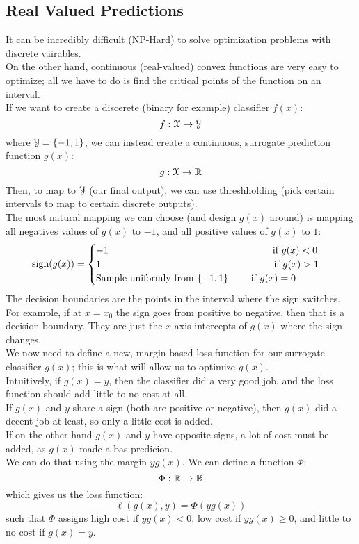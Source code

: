 \documentclass[12pt]{article}
\begin{document}
\newpage

\subsection*{Real Valued Predictions}

It can be incredibly difficult (NP-Hard)
to solve optimization problems with
discrete vairables. \\
On the other hand, continuous (real-valued)
convex functions are very easy to optimize;
all we have to do is find the critical
points of the function on an interval. \\

If we want to create a discerete
(binary for example)
classifier $f(x)$:
\[ f: \mathcal{X} \to \mathcal{Y} \]
where $\mathcal{Y} = \{-1, 1\}$,
we can instead create
a continuous,
surrogate prediction function $g(x)$:
\[ g: \mathcal{X} \to \mathbb{R} \]
Then, to map to $\mathcal{Y}$ (our final output),
we can use threshholding 
(pick certain intervals to map to certain
discrete outputs). \\
The most natural mapping we can choose 
(and design $g(x)$ around)
is mapping all negatives values of $g(x)$
to $-1$,
and all positive values of $g(x)$ to $1$:
\[ \sign(g(x))
= \piecewiseThree{-1 \hspace{146pt} \IF g(x) < 0}
{1 \hspace{155pt} \IF g(x) > 1}
{\text{Sample uniformly from } \{-1, 1\}
\IF g(x) = 0} \]
The decision boundaries are the points
in the interval where the sign switches.
For example, if at $x = x_0$
the sign goes from positive to negative,
then that is a decision boundary.
They are just the $x$-axis intercepts
of $g(x)$ where the sign changes. \\

We now need to define a new, margin-based
loss function for our surrogate
classifier $g(x)$; this is what will allow
us to optimize $g(x)$. \\
Intuitively, if $g(x) = y$,
then the classifier did a very good job,
and the loss function should add little to
no cost at all. \\
If $g(x)$ and $y$ share a sign
(both are positive or negative),
then $g(x)$ did a decent job at least,
so only a little cost is added. \\
If on the other hand $g(x)$ and $y$
have opposite signs, a lot of cost must be
added, as $g(x)$ made a bas predicion. \\
We can do that using the margin $yg(x)$.
We can define a function $\Phi$:
\[ \Phi: \mathbb{R} \to \mathbb{R} \]
which gives us the loss function:
\[ \ell(g(x), y) = \Phi(yg(x)) \]
such that $\Phi$
assigns high cost if $yg(x) < 0$,
low cost if $yg(x) \geq 0$,
and little to no cost if $g(x) = y$. \\
\end{document}
